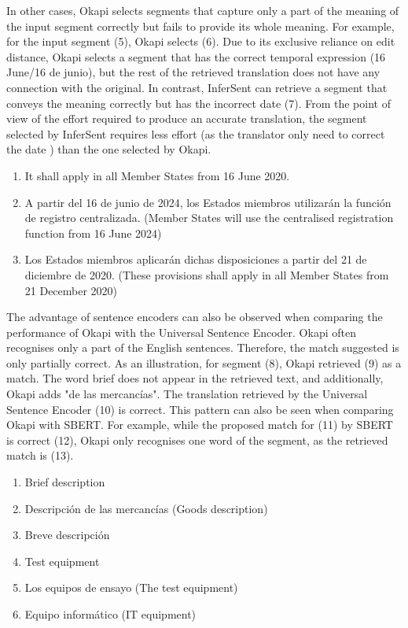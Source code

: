 In other cases, Okapi selects segments that capture only a part of the meaning of the input segment correctly but fails to provide its whole meaning. For example, for the input segment (5), Okapi selects (6). Due to its exclusive reliance on edit distance, Okapi selects a segment that has the correct temporal expression (16 June/16 de junio), but the rest of the retrieved translation does not have any connection with the original. In contrast, InferSent can retrieve a segment that conveys the meaning correctly but has the incorrect date (7). From the point of view of the effort required to produce an accurate translation, the segment selected by InferSent requires less effort (as the translator only need to correct the date ) than the one selected by Okapi. 

\begin{enumerate}[resume,label={(\arabic*)}]
	\item It shall apply in all Member States from 16 June 2020.
	\item A partir del 16 de junio de 2024, los Estados miembros utilizarán la función de registro centralizada. (Member States will use the centralised registration function from 16 June 2024)
	\item Los Estados miembros aplicarán dichas disposiciones a partir del 21 de diciembre de 2020. (These provisions shall apply in all Member States from 21 December 2020)
	
\end{enumerate}

The advantage of sentence encoders can also be observed when comparing the performance of Okapi with the Universal Sentence Encoder. Okapi often recognises only a part of the English sentences. Therefore, the match suggested is only partially correct. As an illustration, for segment (8), Okapi retrieved (9) as a match. The word brief does not appear in the retrieved text, and additionally, Okapi adds "de las mercancías". The translation retrieved by the Universal Sentence Encoder (10) is correct. This pattern can also be seen when comparing Okapi with SBERT. For example, while the proposed match for (11) by SBERT is correct (12), Okapi only recognises one word of the segment, as the retrieved match is (13). 

\begin{enumerate}[resume,label={(\arabic*)}]
	\item	Brief description
	\item	Descripción de las mercancías (Goods description)
	\item	Breve descripción
	\item	Test equipment
	\item	Los equipos de ensayo (The test equipment)
	\item	Equipo informático (IT equipment)
\end{enumerate}


